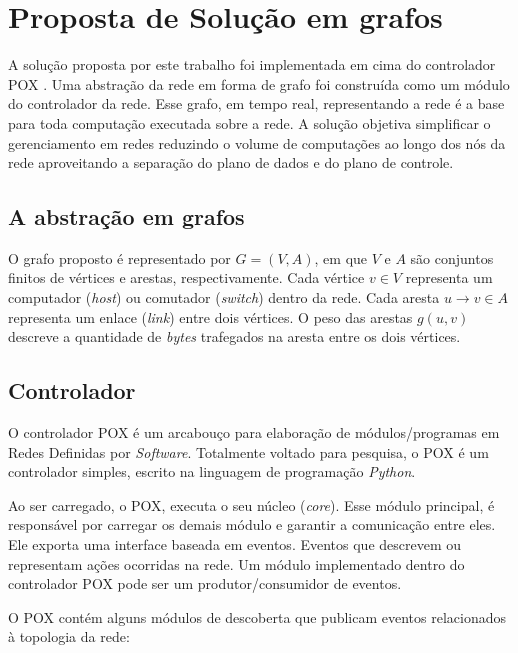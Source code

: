 \chapter{Proposta de Solução em grafos}

A solução proposta por este trabalho foi implementada em cima do controlador
POX \citep{pox2015}.
Uma abstração da rede em forma de grafo foi construída como um módulo
do controlador da rede.
Esse grafo, em tempo real, representando a rede é a base para toda computação
executada sobre a rede.
A solução objetiva simplificar o gerenciamento em redes reduzindo o volume
de computações ao longo dos nós da rede aproveitando a separação do plano
de dados e do plano de controle.

\section{A abstração em grafos}

O grafo proposto é representado por $G=(V, A)$, em que $V$ e $A$ são conjuntos
finitos de vértices e arestas, respectivamente.
Cada vértice $v \in V$ representa um computador (\emph{host}) ou comutador
(\emph{switch}) dentro da rede.
Cada aresta $u \to v \in A$ representa um enlace (\emph{link}) entre dois
vértices.
O peso das arestas $g(u, v)$ descreve a quantidade de \emph{bytes} trafegados
na aresta entre os dois vértices.

\section{Controlador}
\label{sec:controller}

O controlador POX é um arcabouço para elaboração de módulos/programas
em Redes Definidas por \emph{Software}.
Totalmente voltado para pesquisa, o POX é um controlador simples,
escrito na linguagem de programação \emph{Python}.

Ao ser carregado, o POX, executa o seu núcleo (\emph{core}).
Esse módulo principal, é responsável por carregar os demais
módulo e garantir a comunicação entre eles.
Ele exporta uma interface baseada em eventos.
Eventos que descrevem ou representam ações ocorridas na rede.
Um módulo implementado dentro do controlador POX pode ser um
produtor/consumidor de eventos.

O POX contém alguns módulos de descoberta que publicam eventos relacionados
à topologia da rede:

